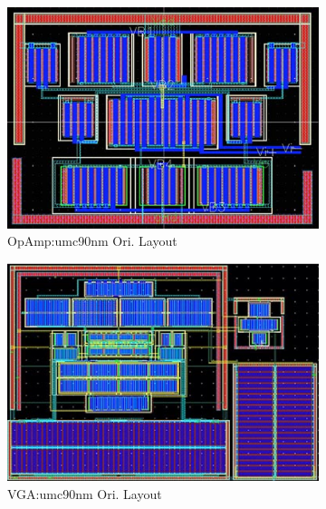       \begin{figure}[ht]
        \centering
          \begin{subfigure}[t]{0.4\textwidth}
          \includegraphics[width=\textwidth]{Fig/ML_OPU90.eps}
          \caption{OpAmp:umc90nm Ori. Layout}\label{fig:ML_OPU90}
          \end{subfigure}
          \begin{subfigure}[t]{0.4\textwidth}
          \includegraphics[width=\textwidth]{Fig/ML_VGAU90.eps}
          \caption{VGA:umc90nm Ori. Layout}\label{fig:ML_VGAU90}
          \end{subfigure}
          \begin{subfigure}[t]{0.4\textwidth}

\end{subfigure}
\end{figure}
